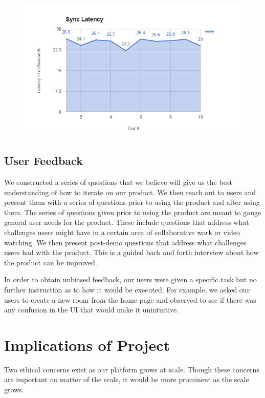\documentclass[conference]{IEEEtran}
\begin{document}
    \begin{figure}[H]
      \centering
      \includegraphics[width=\linewidth]{figure4.PNG}
      \caption{}
      \label{fig:my_label}
    \end{figure}

\subsection{User Feedback}
    We constructed a series of questions that we believe will give us the best understanding of how to iterate on our product. We then reach out to users and present them with a series of questions prior to using the product and after using them. The series of questions given prior to using the product are meant to gauge general user needs for the product. These include questions that address what challenges users might have in a certain area of collaborative work or video watching. We then present post-demo questions that address what challenges users had with the product. This is a guided back and forth interview about how the product can be improved.

    In order to obtain unbiased feedback, our users were given a specific task but no further instruction as to how it would be executed. For example, we asked our users to create a new room from the home page and observed to see if there was any confusion in the UI that would make it unintuitive.

\section{Implications of Project}

    Two ethical concerns exist as our platform grows at scale. Though these concerns are important no matter of the scale, it would be more prominent as the scale grows.
\end{document}
